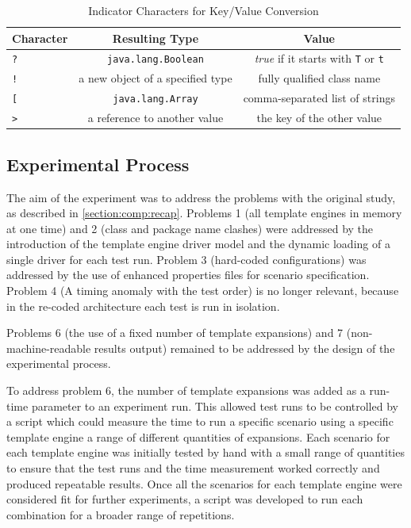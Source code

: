 \begin{table}[ht!]
\centering
\begin{tabular}{lcc}
\textbf{Character} & \textbf{Resulting Type}  & \textbf{Value} \\
\hline
\verb!?!   & \verb!java.lang.Boolean! & \emph{true} if it starts with \verb!T! or \verb!t! \\
\verb|!|   & a new object of a specified type & fully qualified class name \\
\verb![!   & \verb!java.lang.Array! & comma-separated list of strings \\
\verb!>!   & a reference to another value & the key of the other value \\
\end{tabular}
\caption{Indicator Characters for Key/Value Conversion\label{table:indicator characters}}
\end{table}

\subsection{Experimental Process}
\label{comp:experimental process}

The aim of the experiment was to address the problems with the original study, as described in \autoref{section:comp:recap}. Problems 1 (all template engines in memory at one time) and 2 (class and package name clashes) were addressed by the introduction of the template engine driver model and the dynamic loading of a single driver for each test run. Problem 3 (hard-coded configurations) was addressed by the use of enhanced properties files for scenario specification. Problem 4 (A timing anomaly with the test order) is no longer relevant, because in the re-coded architecture each test is run in isolation.

Problems 6 (the use of a fixed number of template expansions) and 7 (non-machine-readable results output) remained to be addressed by the design of the experimental process.

To address problem 6, the number of template expansions was added as a run-time parameter to an experiment run. This allowed test runs to be controlled by a script which could measure the time to run a specific scenario using a specific template engine a range of different quantities of expansions. Each scenario for each template engine was initially tested by hand with a small range of quantities to ensure that the test runs and the time measurement worked correctly and produced repeatable results. Once all the scenarios for each template engine were considered fit for further experiments, a script was developed to run each combination for a broader range of repetitions.

